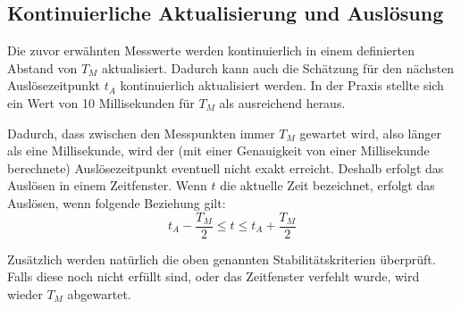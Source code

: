 \subsection{Kontinuierliche Aktualisierung und Auslösung}\label{design_aktualisierung}
Die zuvor erwähnten Messwerte werden kontinuierlich in einem definierten Abstand von $T_M$ aktualisiert.
Dadurch kann auch die Schätzung für den nächsten Auslösezeitpunkt $t_A$ kontinuierlich aktualisiert werden.
In der Praxis stellte sich ein Wert von 10 Millisekunden für $T_M$ als ausreichend heraus.

Dadurch, dass zwischen den Messpunkten immer $T_M$ gewartet wird, also länger als eine Millisekunde, wird der (mit einer Genauigkeit von einer Millisekunde berechnete) Auslösezeitpunkt eventuell nicht exakt erreicht.
Deshalb erfolgt das Auslösen in einem Zeitfenster.
Wenn $t$ die aktuelle Zeit bezeichnet, erfolgt das Auslösen, wenn folgende Beziehung gilt:
\begin{equation*}
t_A - \frac{T_M}{2} \leq t \leq t_A + \frac{T_M}{2}
\end{equation*}

Zusätzlich werden natürlich die oben genannten Stabilitätskriterien überprüft.
Falls diese noch nicht erfüllt sind, oder das Zeitfenster verfehlt wurde, wird wieder $T_M$ abgewartet.
